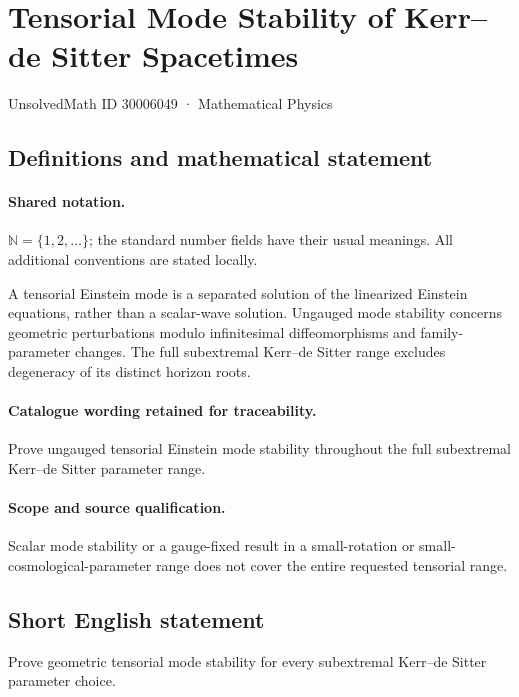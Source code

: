 \documentclass[11pt]{article}
\begin{document}
\setcounter{section}{30006048}
\section{Tensorial Mode Stability of Kerr–de Sitter Spacetimes}\label{30006049}
{\small UnsolvedMath ID 30006049 · Mathematical Physics}
\subsection{Definitions and mathematical statement}

\paragraph{Shared notation.}$\mathbb N=\{1,2,\ldots\}$; the standard number fields have their usual meanings. All additional conventions are stated locally.


A tensorial Einstein mode is a separated solution of the linearized Einstein equations, rather than a scalar-wave solution. Ungauged mode stability concerns geometric perturbations modulo infinitesimal diffeomorphisms and family-parameter changes. The full subextremal Kerr--de Sitter range excludes degeneracy of its distinct horizon roots.

\paragraph{Catalogue wording retained for traceability.}
Prove ungauged tensorial Einstein mode stability throughout the full subextremal Kerr–de Sitter parameter range.

\paragraph{Scope and source qualification.}Scalar mode stability or a gauge-fixed result in a small-rotation or small-cosmological-parameter range does not cover the entire requested tensorial range.
\subsection{Short English statement}
Prove geometric tensorial mode stability for every subextremal Kerr--de Sitter parameter choice.
\end{document}
